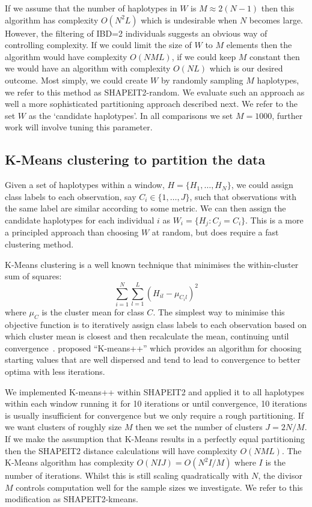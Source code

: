  If we assume that the number of haplotypes in $W$ is $M\approx2(N-1)$ then this algorithm has complexity $O(N^2L)$ which is undesirable when $N$ becomes large. However, the filtering of IBD=2 individuals suggests an obvious way of controlling complexity. If we could limit the size of $W$ to $M$ elements then the algorithm would have complexity $O(NML)$, if we could keep $M$ constant then we would have an algorithm with complexity $O(NL)$ which is our desired outcome.  Most simply, we could create $W$ by randomly sampling $M$ haplotypes, we refer to this method as SHAPEIT2-random. We evaluate such an approach as well a more sophisticated partitioning approach described next.  We refer to the set $W$ as the `candidate haplotypes'.  In all comparisons we set $M=1000$, further work will involve tuning this parameter.

\subsection{K-Means clustering to partition the data}
Given a set of haplotypes within a window, $H=\{H_1,\ldots,H_N\}$, we could assign class labels to each observation, say $C_i \in \{1, \ldots ,J\}$, such that observations with the same label are similar according to some metric. We can then assign the candidate haplotypes for each individual $i$ as $W_i = \{H_j: C_j =C_i \}$. This is a more a principled approach than choosing $W$ at random, but does require a fast clustering method.

K-Means clustering is a well known technique that minimises the within-cluster sum of squares:
$$\sum_{i=1}^N \sum_{l=1}^L (H_{il} - \mu_{C_i l})^2$$
where $\mu_C$ is the cluster mean for class $C$.  The simplest way to minimise this objective function is to iteratively assign class labels to each observation based on which cluster mean is closest and then recalculate the mean, continuing until convergence~\citep{lloyd1982least}. \cite{arthur2007k} proposed ``K-means++'' which provides an algorithm for choosing starting values that are well dispersed and tend to lead to convergence to better optima with less iterations.

We implemented K-means++ within SHAPEIT2 and applied it to all haplotypes within each window running it for 10 iterations or until convergence, 10 iterations is usually insufficient for convergence but we only require a rough partitioning.  If we want clusters of roughly size $M$ then we set the number of clusters $J=2N/M$. If we make the assumption that K-Means results in a perfectly equal partitioning then the SHAPEIT2 distance calculations will have complexity $O(NML)$. The K-Means algorithm has complexity $O(NIJ) = O(N^2I/M)$ where $I$ is the number of iterations.  Whilst this is still scaling quadratically with $N$, the divisor $M$ controls computation well for the sample sizes we investigate.  We refer to this modification as SHAPEIT2-kmeans.

